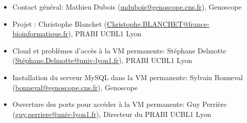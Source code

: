 \begin{itemize}
    \item Contact général: Mathieu Dubois (\href{mailto:mdubois@genoscope.cns.fr}{mdubois@genoscope.cns.fr}), Genoscope
    \item Projet : Christophe Blanchet (\href{mailto:Christophe.BLANCHET@france-bioinformatique.fr}{Christophe.BLANCHET@france-bioinformatique.fr}), PRABI UCBL1 Lyon
    \item Cloud  et problèmes d'accès à la VM permanente: Stéphane Delmotte (\href{mailto:Stéphane.Delmotte@univ-lyon1.fr}{Stéphane.Delmotte@univ-lyon1.fr}), PRABI UCBL1 Lyon
    \item Installation du serveur MySQL dans la VM permanente: Sylvain Bonneval (\href{mailto:bonneval@genoscope.cns.fr}{bonneval@genoscope.cns.fr}), Genoscope
    \item Ouverture des ports pour accéder à la VM permanente: Guy Perrière (\href{mailto:guy.perriere@univ-lyon1.fr}{guy.perriere@univ-lyon1.fr}), Directeur du PRABI UCBL1 Lyon
\end{itemize}
